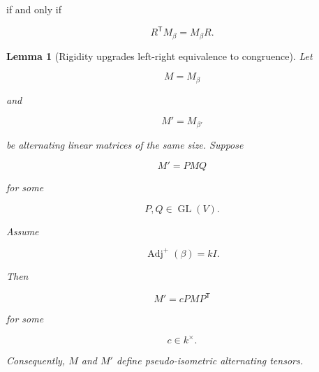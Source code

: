\documentclass[11pt]{article}
\newtheorem{lemma}[theorem]{Lemma}
\begin{document}
if and only if

\[
R^{\mathsf T}M_\beta=M_\beta R.
\]

\begin{lemma}[Rigidity upgrades left-right equivalence to congruence]

Let

\[
M=M_\beta
\]

and

\[
M'=M_{\beta'}
\]

be alternating linear matrices of the same size. Suppose

\[
M'=P M Q
\]

for some

\[
P,Q\in \operatorname{GL}(V).
\]

Assume

\[
\operatorname{Adj}^+(\beta)=kI.
\]

Then

\[
M'=c P M P^{\mathsf T}
\]

for some

\[
c\in k^\times.
\]

Consequently, $M$ and $M'$ define pseudo-isometric alternating tensors.

\end{lemma}
\end{document}
